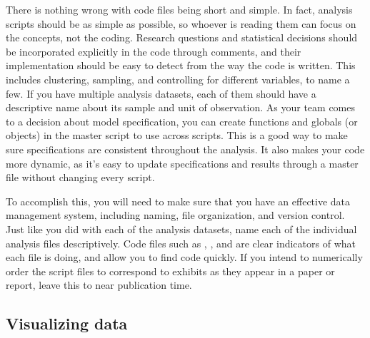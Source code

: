 There is nothing wrong with code files being short and simple.
In fact, analysis scripts should be as simple as possible,
so whoever is reading them can focus on the concepts, not the coding.
Research questions and statistical decisions should be incorporated explicitly in the code through comments,
and their implementation should be easy to detect from the way the code is written.
This includes clustering, sampling, and controlling for different variables, to name a few.
If you have multiple analysis datasets,
each of them should have a descriptive name about its sample and unit of observation.
As your team comes to a decision about model specification,
you can create functions and globals (or objects) in the master script to use across scripts.
This is a good way to make sure specifications are consistent throughout the analysis.
It also makes your code more dynamic,
as it's easy to update specifications and results 
through a master file without changing every script.


To accomplish this, you will need to make sure that you have an effective data management system,
including naming, file organization, and version control.
Just like you did with each of the analysis datasets,
name each of the individual analysis files descriptively.
Code files such as ,
, and 
are clear indicators of what each file is doing, and allow you to find code quickly.
If you intend to numerically order the script files 
to correspond to exhibits as they appear in a paper or report,
leave this to near publication time.

\subsection{Visualizing data}

